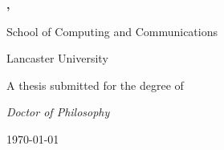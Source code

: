 

\begin{titlepage}

\center

\vspace{1cm} %

\huge  \textbf{\thesistitle}

\vspace{2cm}

\Large \textbf{\authorname, \authordegrees}

School of Computing and Communications

Lancaster University

\vfill

\large

A thesis submitted for the degree of

\textit{Doctor of Philosophy}

\vspace{0.5cm}

\monthyeardate\today

\end{titlepage}